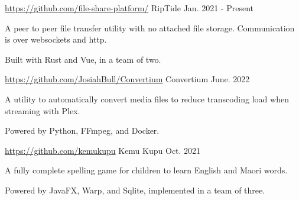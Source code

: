 
\begin{cventries}
  \cventry
    {\href{https://google.com}{\faLink \space https://github.com/file-share-platform/}} %
    {RipTide} %
    {} %
    {Jan. 2021 - Present} %
    {
      \begin{cvitems} %
        \item {A peer to peer file transfer utility with no attached file storage. Communication is over websockets and http.}
        \item {Built with Rust and Vue, in a team of two.}
      \end{cvitems}
    }

  \cventry
  {\href{https://google.com}{\faLink \space https://github.com/JosiahBull/Convertium}} %
  {Convertium} %
  {} %
  {June. 2022} %
  {
    \begin{cvitems} %
      \item {A utility to automatically convert media files to reduce transcoding load when streaming with Plex.}
      \item {Powered by Python, FFmpeg, and Docker.}
    \end{cvitems}
  }

  \cventry
    {\href{https://google.com}{\faLink \space https://github.com/kemukupu}} %
    {Kemu Kupu} %
    {} %
    {Oct. 2021} %
    {
      \begin{cvitems} %
        \item {A fully complete spelling game for children to learn English and Maori words.}
        \item {Powered by JavaFX, Warp, and Sqlite, implemented in a team of three.}
      \end{cvitems}
    }

\end{cventries}

